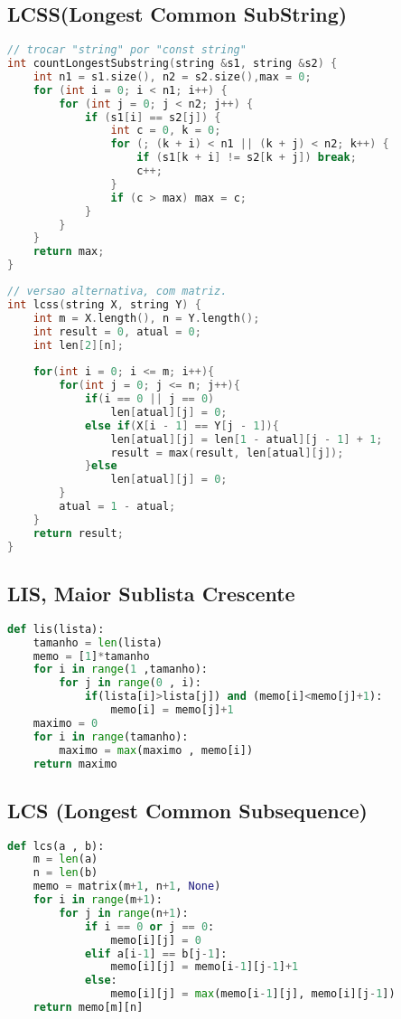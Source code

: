 \subsection{LCSS(Longest Common SubString)}
\begin{lstlisting}[language=C++]
// trocar "string" por "const string"
int countLongestSubstring(string &s1, string &s2) {
    int n1 = s1.size(), n2 = s2.size(),max = 0;
    for (int i = 0; i < n1; i++) {
        for (int j = 0; j < n2; j++) {
            if (s1[i] == s2[j]) {
                int c = 0, k = 0;
                for (; (k + i) < n1 || (k + j) < n2; k++) {
                    if (s1[k + i] != s2[k + j]) break;
                    c++;
                }
                if (c > max) max = c;
            }
        }
    }
    return max;
}
\end{lstlisting}
\begin{lstlisting}[language=C++]
// versao alternativa, com matriz.
int lcss(string X, string Y) { 
    int m = X.length(), n = Y.length();
    int result = 0, atual = 0;
    int len[2][n];
    
    for(int i = 0; i <= m; i++){ 
        for(int j = 0; j <= n; j++){ 
            if(i == 0 || j == 0)
                len[atual][j] = 0; 
            else if(X[i - 1] == Y[j - 1]){ 
                len[atual][j] = len[1 - atual][j - 1] + 1; 
                result = max(result, len[atual][j]); 
            }else
                len[atual][j] = 0; 
        }
        atual = 1 - atual; 
    }
    return result; 
} 
\end{lstlisting}
\subsection{LIS, Maior Sublista Crescente}
\begin{lstlisting}[language=Python]
def lis(lista):
	tamanho = len(lista)
	memo = [1]*tamanho
	for i in range(1 ,tamanho):
		for j in range(0 , i):
			if(lista[i]>lista[j]) and (memo[i]<memo[j]+1):
				memo[i] = memo[j]+1
	maximo = 0
	for i in range(tamanho):
		maximo = max(maximo , memo[i])
	return maximo

\end{lstlisting}
\newpage
\subsection{LCS (Longest Common Subsequence)}
\begin{lstlisting}[language = Python]
def lcs(a , b):
    m = len(a)
    n = len(b)
    memo = matrix(m+1, n+1, None)
    for i in range(m+1):
        for j in range(n+1):
            if i == 0 or j == 0:
                memo[i][j] = 0
            elif a[i-1] == b[j-1]:
                memo[i][j] = memo[i-1][j-1]+1
            else:
                memo[i][j] = max(memo[i-1][j], memo[i][j-1])
    return memo[m][n]
\end{lstlisting}